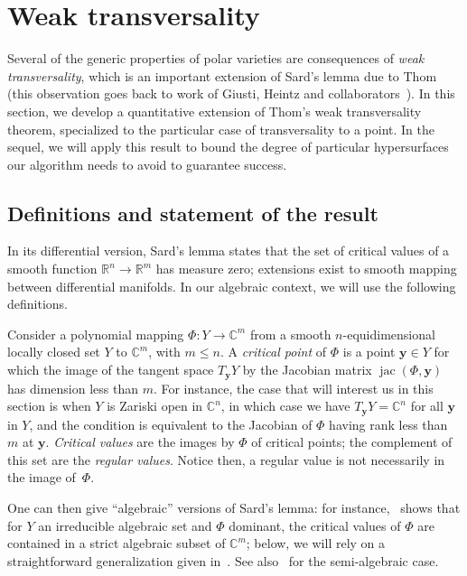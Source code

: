 \documentclass[12pt]{article}
\DeclareMathOperator{\jac}{jac}
\def\C{\mathbb{C}}
\def\R{\mathbb{R}}
\begin{document}

\section{Weak transversality}\label{sec:wt}

Several of the generic properties of polar varieties are consequences
of {\em weak transversality}, which is an important extension of
Sard's lemma due to Thom (this observation goes back to work of
Giusti, Heintz and collaborators~\cite{BaGiHeMb97,BaGiHeLePa12}).  In
this section, we develop a quantitative extension of Thom's weak
transversality theorem, specialized to the particular case of
transversality to a point. In the sequel, we will apply this result to
bound the degree of particular hypersurfaces our algorithm needs to
avoid to guarantee success.


\subsection{Definitions and statement of the result}

In its differential version, Sard's lemma states that the set of
critical values of a smooth function $\R^n \to \R^m$ has measure zero;
extensions exist to smooth mapping between differential manifolds.  In
our algebraic context, we will use the following definitions.

Consider a polynomial mapping $\Phi : Y \rightarrow \C^m$ from a
smooth $n$-equidimensional locally closed set $Y$ to $\C^m$, with
$m\le n$. A {\em critical point} of $\Phi$ is a point $\bm y \in Y$
for which the image of the tangent space $T_{\bm y} Y$ by the Jacobian
matrix $\jac(\Phi,\bm y)$ has dimension less than $m$. For instance,
the case that will interest us in this section is when $Y$ is Zariski
open in $\C^n$, in which case we have $T_{\bm y} Y=\C^n$ for all $\bm
y$ in $Y$, and the condition is equivalent to the Jacobian of $\Phi$
having rank less than $m$ at $\bm y$. {\em Critical values} are the
images by $\Phi$ of critical points; the complement of this set are
the {\em regular values}. Notice then, a regular value is not
necessarily in the image of~$\Phi$.

One can then give ``algebraic'' versions of Sard's lemma: for
instance,~\cite[(3.7)]{Mumford76} shows that for $Y$ an irreducible
algebraic set and $\Phi$ dominant, the critical values of $\Phi$ are
contained in a strict algebraic subset of $\C^m$; below, we will rely
on a straightforward generalization given in~\cite{TWT}. See
also~\cite[Chapter~9]{bochnak1998real} for the semi-algebraic case.
\end{document}
